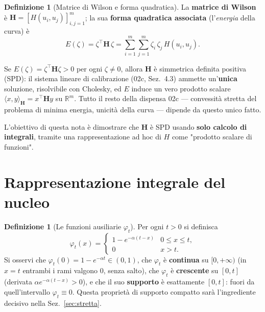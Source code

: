 \documentclass[11pt,a4paper]{article}
\theoremstyle{plain}
\theoremstyle{definition}
\newtheorem{definizione}[teorema]{Definizione}
\theoremstyle{remark}
\newcommand{\Hmat}{\mathbf{H}}
\newcommand{\transp}{^{\!\top}}
\begin{document}
\begin{definizione}[Matrice di Wilson e forma quadratica]
La \textbf{matrice di Wilson} è $\Hmat = [H(u_i,u_j)]_{i,j=1}^m$; la sua \textbf{forma
quadratica associata} (l'\emph{energia} della curva) è
\[
  E(\zeta) = \zeta\transp\Hmat\,\zeta = \sum_{i=1}^m\sum_{j=1}^m \zeta_i\,\zeta_j\,H(u_i,u_j).
\]
\end{definizione}

\begin{keybox}
Se $E(\zeta)=\zeta\transp\Hmat\zeta>0$ per ogni $\zeta\neq 0$, allora $\Hmat$ è simmetrica
definita positiva (SPD): il sistema lineare di calibrazione (02c, Sez.~4.3) ammette
un'\textbf{unica} soluzione, risolvibile con Cholesky, ed $E$ induce un vero prodotto scalare
$\langle x,y\rangle_\Hmat = x\transp\Hmat y$ su $\mathbb{R}^m$. Tutto il resto della dispensa 02c
--- convessità stretta del problema di minima energia, unicità della curva --- dipende da
questo unico fatto.
\end{keybox}

L'obiettivo di questa nota è dimostrare che $\Hmat$ è SPD usando \textbf{solo calcolo di
integrali}, tramite una rappresentazione ad hoc di $H$ come "prodotto scalare di funzioni".

\section{Rappresentazione integrale del nucleo}
\label{sec:rappresentazione}

\begin{definizione}[Le funzioni ausiliarie $\varphi_t$]
Per ogni $t>0$ si definisca
\[
  \varphi_t(x) =
  \begin{cases}
    1-e^{-\alpha(t-x)} & 0\le x\le t,\\[2pt]
    0 & x>t .
  \end{cases}
\]
Si osservi che $\varphi_t(0)=1-e^{-\alpha t}\in(0,1)$, che $\varphi_t$ è \textbf{continua} su
$[0,+\infty)$ (in $x=t$ entrambi i rami valgono $0$, senza salto), che $\varphi_t$ è
\textbf{crescente} su $[0,t]$ (derivata $\alpha e^{-\alpha(t-x)}>0$), e che il suo
\textbf{supporto} è esattamente $[0,t]$: fuori da quell'intervallo $\varphi_t\equiv 0$. Questa
proprietà di supporto compatto sarà l'ingrediente decisivo nella Sez.~\ref{sec:stretta}.
\end{definizione}
\end{document}
